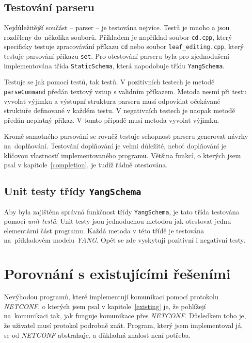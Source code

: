 \documentclass[thesis=B,czech,hidelinks]{FITthesis}[2019/03/06]
\begin{document}
\subsection{Testování parseru}
Nejdůležitější součást -- parser -- je testována nejvíce. Testů je mnoho a jsou rozděleny do~několika souborů. Příkladem je například soubor \texttt{cd.cpp}, který specificky testuje zpracovávání příkazu \texttt{cd} nebo soubor \texttt{leaf\_editing.cpp}, který testuje parsování příkazu \texttt{set}. Pro otestování parseru byla pro zjednodušení implementována třída \texttt{StaticSchema}, která napodobuje třídu \texttt{YangSchema}.

Testuje se jak pomocí  testů, tak  testů. V pozitivních testech je metodě \texttt{parseCommand} předán textový vstup s validním příkazem. Metoda nesmí při testu vyvolat výjimku a výstupní struktura parseru musí odpovídat očekávané struktuře definované v každém testu. V negativních testech je naopak metodě předán neplatný příkaz. V tomto případě musí metoda vyvolat výjimku.

Kromě samotného parsování se rovněž testuje schopnost parseru generovat návrhy na~doplňování. Testování doplňování je velmi důležité, neboť doplňování je klíčovou vlastností implementovaného programu. Většina funkcí, o kterých jsem psal v kapitole~\ref{completion}, je tudíž řádně otestována.

\subsection{Unit testy třídy \texttt{YangSchema}}
Aby byla zajištěna správná funkčnost třídy \texttt{YangSchema}, je tato třída testována pomocí \textit{unit testů}. Unit testy jsou jednoduchou metodou jak otestovat jednu elementární část programu. Každá metoda v této třídě je testována na~příkladovém modelu \textit{YANG}. Opět se zde vyskytují pozitivní i negativní testy.


\section{Porovnání s existujícími řešeními}
Nevýhodou programů, které implementují komunikaci pomocí protokolu \textit{NETCONF}, o kterých jsem psal v kapitole~\ref{existing} je, že pohlížejí na~komunikaci tak, jak funguje komunikace přes \textit{NETCONF}. Důsledkem toho je, že uživatel musí protokol podrobně znát. Program, který jsem implementoval já, se od \textit{NETCONF} abstrahuje, a důkladná znalost není potřeba.
\end{document}

